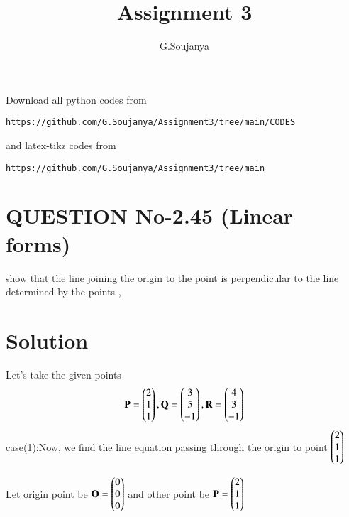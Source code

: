 \documentclass[journal,12pt,twocolumn]{IEEEtran}
\begin{document}
     \def\rightbox#1{\makebox[0in][r]{#1}}
     \def\centbox#1{\makebox[0in]{#1}}
     \def\topbox#1{\raisebox{-\baselineskip}[0in][0in]{#1}}
     \def\midbox#1{\raisebox{-0.5\baselineskip}[0in][0in]{#1}}
\vspace{3cm}
\title{Assignment 3}
\author{G.Soujanya}
\maketitle
\newpage
\bigskip
\renewcommand{\thefigure}{\theenumi}
\renewcommand{\thetable}{\theenumi}
Download all python codes from 
\begin{lstlisting}
https://github.com/G.Soujanya/Assignment3/tree/main/CODES
\end{lstlisting}
%
and latex-tikz codes from 
%
\begin{lstlisting}
https://github.com/G.Soujanya/Assignment3/tree/main
\end{lstlisting}
%
%
\section{QUESTION No-2.45 (Linear forms)}
show that the line joining the origin to the  point  is perpendicular to the line determined by the points , 
%
\section{Solution}
Let's take the given points 
\begin{align}
  \mathbf{P}=\begin{pmatrix}2\\1\\1\end{pmatrix} , \mathbf{Q}=\begin{pmatrix}3\\5\\-1\end{pmatrix} ,\mathbf{R}=\begin{pmatrix}4\\3\\-1\end{pmatrix}  
\end{align}
case(1):Now, we find the line equation passing through the origin to point $\begin{pmatrix}2\\1\\1\end{pmatrix}$

Let origin point be $\mathbf{O}=\begin{pmatrix}0\\0\\0\end{pmatrix}$ and other point be $\mathbf{P}=\begin{pmatrix}2\\1\\1\end{pmatrix}$
\end{document}
